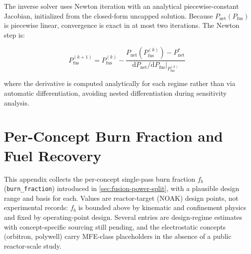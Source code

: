 \documentclass{article}
\begin{document}
\noindent The inverse solver uses Newton iteration with an analytical
piecewise-constant Jacobian, initialized from the closed-form uncapped
solution. Because $P_{\text{net}}(P_{\text{fus}})$ is piecewise linear,
convergence is exact in at most two iterations. The Newton step is:

\begin{equation}
P_{\text{fus}}^{(k+1)} = P_{\text{fus}}^{(k)}
  - \frac{P_{\text{net}}(P_{\text{fus}}^{(k)}) - P_{\text{net}}^*}
         {\mathrm{d}P_{\text{net}}/\mathrm{d}P_{\text{fus}}\big|_{P_{\text{fus}}^{(k)}}}
\end{equation}

\noindent where the derivative is computed analytically for each regime
rather than via automatic differentiation, avoiding nested
differentiation during sensitivity analysis.


\section{Per-Concept Burn Fraction and Fuel Recovery}
\label{app:burn-fraction}

This appendix collects the per-concept single-pass burn fraction $f_b$
(\texttt{burn\_fraction}) introduced in \cref{sec:fusion-power-split}, with a
plausible design range and basis for each. Values are reactor-target (NOAK)
design points, not experimental records: $f_b$ is bounded above by kinematic
and confinement physics and fixed by operating-point design. Several entries
are design-regime estimates with concept-specific sourcing still pending, and
the electrostatic concepts (orbitron, polywell) carry MFE-class placeholders
in the absence of a public reactor-scale study.
\end{document}
